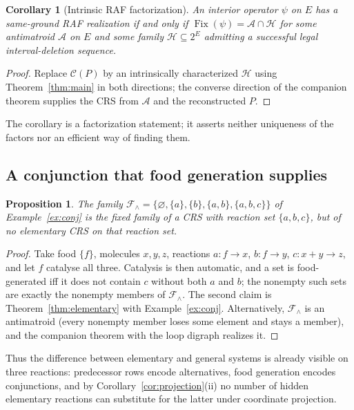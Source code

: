 \documentclass[11pt,a4paper]{article}
\theoremstyle{plain}
\newtheorem{proposition}[theorem]{Proposition}
\newtheorem{corollary}[theorem]{Corollary}
\theoremstyle{definition}
\theoremstyle{remark}
\newcommand{\cA}{\mathcal A}
\newcommand{\cC}{\mathcal C}
\newcommand{\cF}{\mathcal F}
\newcommand{\cH}{\mathcal H}
\newcommand{\Fix}{\operatorname{Fix}}
\newcommand{\pw}[1]{2^{#1}}
\begin{document}
\begin{corollary}[Intrinsic RAF factorization]\label{cor:factor}
An interior operator $\psi$ on $E$ has a same-ground RAF realization if and only if $\Fix(\psi)=\cA\cap\cH$ for some antimatroid $\cA$ on $E$ and some family $\cH\subseteq\pw{E}$ admitting a successful legal interval-deletion sequence.
\end{corollary}

\begin{proof}
Replace $\cC(P)$ by an intrinsically characterized $\cH$ using Theorem~\ref{thm:main} in both directions; the converse direction of the companion theorem supplies the CRS from $\cA$ and the reconstructed $P$.
\end{proof}

The corollary is a factorization statement; it asserts neither uniqueness of the factors nor an efficient way of finding them.

\subsection{A conjunction that food generation supplies}

\begin{proposition}\label{prop:conjunction-crs}
The family $\cF_\wedge=\{\varnothing,\{a\},\{b\},\{a,b\},\{a,b,c\}\}$ of Example~\ref{ex:conj} is the fixed family of a CRS with reaction set $\{a,b,c\}$, but of no elementary CRS on that reaction set.
\end{proposition}

\begin{proof}
Take food $\{f\}$, molecules $x,y,z$, reactions $a: f\to x$, $b: f\to y$, $c: x+y\to z$, and let $f$ catalyse all three. Catalysis is then automatic, and a set is food-generated iff it does not contain $c$ without both $a$ and $b$; the nonempty such sets are exactly the nonempty members of $\cF_\wedge$. The second claim is Theorem~\ref{thm:elementary} with Example~\ref{ex:conj}. Alternatively, $\cF_\wedge$ is an antimatroid (every nonempty member loses some element and stays a member), and the companion theorem with the loop digraph realizes it.
\end{proof}

Thus the difference between elementary and general systems is already visible on three reactions: predecessor rows encode alternatives, food generation encodes conjunctions, and by Corollary~\ref{cor:projection}(ii) no number of hidden elementary reactions can substitute for the latter under coordinate projection.
\end{document}
